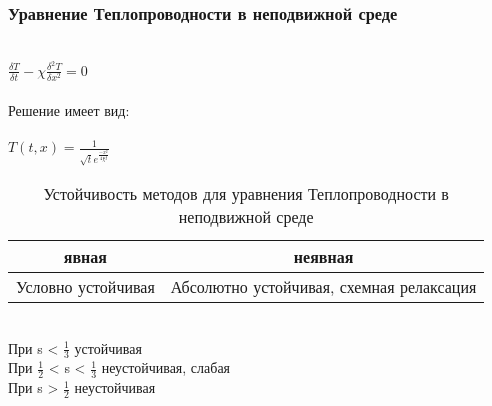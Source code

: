 \documentclass{article}
\begin{document}
\subsubsection{Уравнение Теплопроводности в неподвижной среде}\\
$\frac{\delta T}{\delta t} - \chi \frac{\delta^{2} T}{\delta x^{2}} = 0$\\\\
Решение имеет вид: \\\\
$T(t, x) = \frac{1}{\sqrt{t}e^{\frac{-x^{2}}{4\chi t}}}$
\begin{table}[h!]
    \centering
    \begin{tabular}{|c|c|}
        \hline
          явная & неявная \\
         \hline
         Условно устойчивая& Абсолютно устойчивая, схемная релаксация\\
         \hline
    \end{tabular}
    \caption{Устойчивость методов для уравнения Теплопроводности в неподвижной среде}
    \label{tab:my_label}
\end{table}\\
При s < $\frac{1}{3}$ устойчивая\\
При $\frac{1}{2}$ < s < $\frac{1}{3}$ неустойчивая, слабая\\
При s > $\frac{1}{2}$ неустойчивая\\
\end{document}

